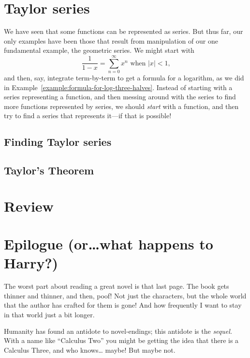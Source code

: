 \documentclass[justified]{tufte-book}
\newcommand{\xrefn}[1]{\ref{#1}}
\begin{document}
\chapter{Taylor series}
\label{chapter:taylor-series}

We have seen that some functions can be represented as
series.  But thus far, our only examples have been those that result
from manipulation of our one fundamental example, the geometric
series.  We might start with
$$
\frac{1}{1-x} = \sum_{n=0}^\infty x^n \mbox{ when $|x| < 1$,}
$$
and then, say, integrate term-by-term to get a formula for a
logarithm, as we did in
Example~\xrefn{example:formula-for-log-three-halves}.  Instead of
starting with a series representing a function, and then messing
around with the series to find more functions represented by series,
we should \textit{start} with a function, and then try to find a
series that represents it---if that is possible!

\section{Finding Taylor series}
\label{section:finding-taylor-series}


\section{Taylor's Theorem}


\chapter*{Review}


\chapter*{Epilogue (or\ldots what happens to Harry?)}

The worst part about reading a great novel is that last page.  The
book gets thinner and thinner, and then, poof!  Not just the
characters, but the whole world that the author has crafted for them
is gone!  And how frequently I want to stay in that world just a bit
longer.

Humanity has found an antidote to novel-endings; this antidote is the
\textit{sequel.}  With a name like ``Calculus Two'' you might be
getting the idea that there is a Calculus Three, and who knows\ldots
maybe!  But maybe not.
\end{document}

